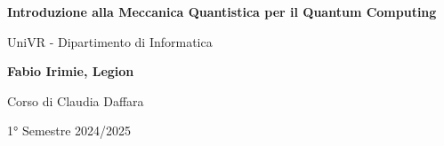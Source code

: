 \begin{titlepage}
	\begin{center}
		\vspace*{1cm}

		\Huge
		\textbf{Introduzione alla Meccanica Quantistica per il Quantum Computing}

		\vspace{0.5cm}
		\LARGE
		UniVR - Dipartimento di Informatica

		\vspace{1.5cm}

		\textbf{Fabio Irimie, Legion}

		\vfill


		\vspace{0.8cm}

    Corso di Claudia Daffara

		1° Semestre 2024/2025

	\end{center}
\end{titlepage}
